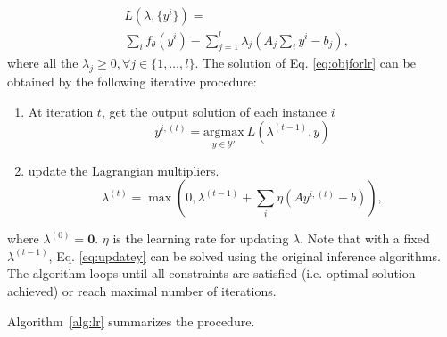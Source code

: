 \begin{equation}\label{eq:lag}
\begin{split}
 &L(\lambda, \{y^i\}) = \\
 &\sum_i f_\theta(y^i) - \sum_{j=1}^l \lambda_j  \left(A_j \sum_i y^i - b_j \right),
 \end{split}
\end{equation}
where all the $\lambda_j \geq 0, \forall j \in \{1,\ldots,l\}$.
The solution of Eq. \eqref{eq:objforlr} can be obtained by the following iterative procedure:
\begin{enumerate}[label={\arabic*})]
    \item At iteration $t$, get the output solution of each instance $i$
    \begin{equation}
    \label{eq:updatey}
    y^{i,(t)} = \underset{y \in \mathcal{Y'}}{\mathrm{argmax}}\ L(\lambda^{(t-1)}, y)
    \end{equation}
    \item update the Lagrangian multipliers. 
    \begin{equation*}
     \label{eq:updatel}
     \lambda^{(t)} \!=\! \max \left(0, \lambda^{(t-1)} \!+\! \sum_i \eta(Ay^{i, (t)} -b)\right),
    \end{equation*}
\end{enumerate}
 where $\lambda^{(0)} = \boldsymbol{0}$. $\eta$ is the learning rate for updating $\lambda$. Note that with a fixed $\lambda^{(t-1)}$, Eq. \eqref{eq:updatey} can be solved using the original inference algorithms. 
 The algorithm loops until all constraints are satisfied (i.e. optimal solution achieved) or reach maximal number of iterations.  
 
 \iffalse
 Algorithm~\ref{alg:lr} summarizes the procedure. 

